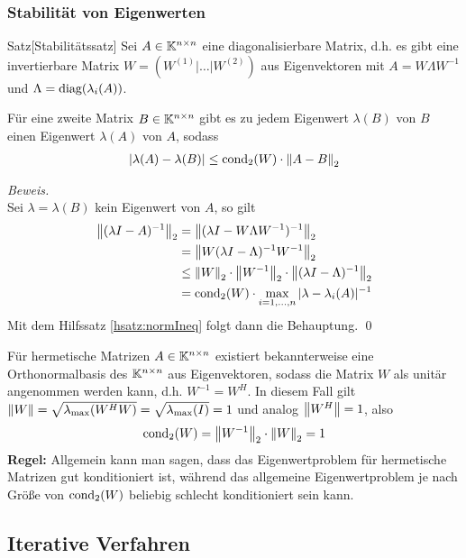 \subsubsection{Stabilität von Eigenwerten}

\begin{colbox}{Satz}[Stabilitätssatz]
  Sei $A\in\mathbb K^{n\times n}$ eine diagonalisierbare Matrix, d.h. es gibt eine invertierbare Matrix 
  $W=(W^{(1)}|\dots|W^{(2)})$ aus Eigenvektoren mit $A=W\Lambda W^{-1}$ und $\Lambda=\text{diag}(\lambda_i(A))$.
  
  Für eine zweite Matrix $B\in\mathbb K^{n\times n}$ gibt es zu 
  jedem Eigenwert $\lambda(B)$ von $B$ einen Eigenwert $\lambda(A)$ von $A$, sodass
  \begin{align*}
    |\lambda(A)-\lambda(B)|\leq\Cond_2(W)\cdot\vertn{2}{A-B}_2
  \end{align*}
\end{colbox}

\textit{Beweis.} \\
Sei $\lambda=\lambda(B)$ kein Eigenwert von $A$, so gilt 
%
\begin{align*}
  \vertn{2}{(\lambda I - A)^{-1}}_2 
  &= \vertn{2}{(\lambda I - W\Lambda W^{-1})^{-1}}_2 \\
  &= \vertn{2}{W(\lambda I - \Lambda)^{-1}W^{-1}}_2 \\
  &\leq \vertn{2}{W}_2\cdot\vertn{2}{W^{-1}}_2\cdot\vertn{2}{(\lambda I-\Lambda)^{-1}}_2\\
  &= \Cond_2(W)\cdot \max_{i=1,\dots,n} |\lambda-\lambda_i(A)|^{-1}
\end{align*}
%
Mit dem Hilfssatz \ref{hsatz:normIneq} folgt dann die Behauptung. 
\qed 

Für hermetische Matrizen $A\in\mathbb K^{n\times n}$ existiert bekannterweise eine Orthonormalbasis des 
$\mathbb K^{n\times n}$ aus Eigenvektoren, sodass die Matrix $W$ als unitär angenommen werden kann, 
d.h. $W^{-1}=W^H$. In diesem Fall gilt $\vertn{2}{W} = \sqrt{\lambda_{\max}(W^HW)} = \sqrt{\lambda_{\max}(I)}=1$
und analog $\vertn{2}{W^H} = 1$, also 
%
\begin{align*}
  \Cond_2(W)=\vertn{2}{W^{-1}}_2\cdot\vertn{2}{W}_2 = 1
\end{align*}
%
\textbf{Regel:} Allgemein kann man sagen, dass das Eigenwertproblem für hermetische Matrizen gut konditioniert
ist, während das allgemeine Eigenwertproblem je nach Größe von $\text{cond}_2(W)$ beliebig schlecht konditioniert 
sein kann.

\subsection{Iterative Verfahren}

